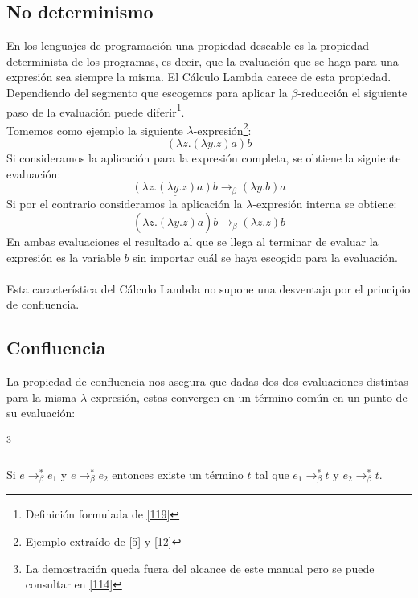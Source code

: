                 \subsection{No determinismo}
                    En los lenguajes de programación una propiedad deseable es la propiedad determinista de los programas, es decir, que la evaluación que se haga para una expresión sea siempre la misma. El Cálculo Lambda carece de esta propiedad. Dependiendo del segmento que escogemos para aplicar la $\beta$-reducción el siguiente paso de la evaluación puede diferir\footnote{Definición formulada de \hyperlink{119}{[119]}}.\\
		   Tomemos como ejemplo la siguiente $\lambda$-expresión\footnote{Ejemplo extraído de \hyperlink{5}{[5]} y  \hyperlink{12}{[12]} }:
                    $$(\lambda z.(\lambda y.z)a)b$$
                    Si consideramos la aplicación para la expresión completa, se obtiene la siguiente evaluación: $$\underline{(\lambda z.(\lambda y.z)a)b} \rightarrow_\beta (\lambda y.b)a$$
                    Si por el contrario consideramos la aplicación la $\lambda$-expresión interna se obtiene: $$(\lambda z.\underline{(\lambda y.z)a})b \rightarrow_\beta (\lambda z.z)b$$
                    En ambas evaluaciones el resultado al que se llega al terminar de evaluar la expresión es la variable $b$ sin importar cuál se haya escogido para la evaluación.\\\\
                    Esta característica del Cálculo Lambda no supone una desventaja por el principio de confluencia.

                \subsection{Confluencia}
                    La propiedad de confluencia nos asegura que dadas dos dos evaluaciones distintas para la misma $\lambda$-expresión, estas convergen en un término común en un punto de su evaluación:

                    \begin{theorem}\footnote{La demostración queda fuera del alcance de este manual pero se puede consultar en \hyperlink{114}{[114]}}\\\\
 Si $e\to_\beta^* e_1$ y $e\to_\beta^*e_2$ entonces existe un término $t$ tal que  $e_1\to_\beta^* t$ y $e_2\to_\beta^* t$.
                    \end{theorem}

